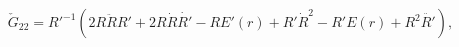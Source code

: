 \begin{equation}
\check{G}_{22}=R'^{-1}\left(2R\ddot{R}R'+2R\dot{R}\dot{R'}-RE'(r)+R'\dot{R}^2-R'E(r)+R^2\ddot{R'}\right),
\end{equation}

